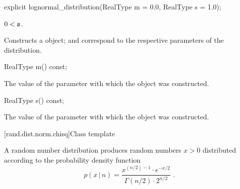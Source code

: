 %
\begin{itemdecl}
explicit lognormal_distribution(RealType m = 0.0, RealType s = 1.0);
\end{itemdecl}

\begin{itemdescr}
\pnum
\requires $0 < \texttt{s}$.

\pnum
\effects Constructs a  object;
 and 
correspond to the respective parameters of the distribution.
\end{itemdescr}

%
\begin{itemdecl}
RealType m() const;
\end{itemdecl}

\begin{itemdescr}
\pnum\returns The value of the  parameter
 with which the object was constructed.
\end{itemdescr}

%
\begin{itemdecl}
RealType s() const;
\end{itemdecl}

\begin{itemdescr}
\pnum\returns The value of the  parameter
 with which the object was constructed.
\end{itemdescr}


[rand.dist.norm.chisq]{Class template }%
%
%

\pnum
A  random number distribution
produces random numbers $x > 0$
distributed according to
the probability density function%
%
%
\[ p(x\,|\,n) = \frac{x^{(n/2)-1} \cdot e^{-x/2}}{\Gamma(n/2) \cdot 2^{n/2}} \text{ .} \]

